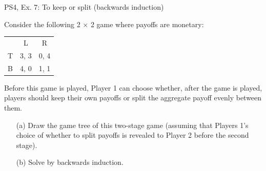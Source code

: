 \begin{frame}{PS4, Ex. 7: To keep or split (backwards induction)}
  \begin{multicols}{2}
    Consider the following 2 × 2 game where payoffs are monetary:
    \begin{table}
      \begin{tabular}{l|c|c|}
          \multicolumn{1}{c}{} & \multicolumn{1}{c}{L} & \multicolumn{1}{c}{R} \\\cline{2-3}
          T & 3, 3 & 0, 4 \\\cline{2-3}
          B & 4, 0 & 1, 1 \\\cline{2-3}
      \end{tabular}
    \end{table}
    Before this game is played, Player 1 can choose whether, after the game is played, players should keep their own payoffs or split the aggregate payoff evenly between them.
  \vfill\null \columnbreak
    \begin{itemize}
      \item[(a)] Draw the game tree of this two-stage game (assuming that Players 1’s choice of whether to split payoffs is revealed to Player 2 before the second stage).
      \item[(b)] Solve by backwards induction.
    \end{itemize}
  \vfill\null
  \end{multicols}
\end{frame}
